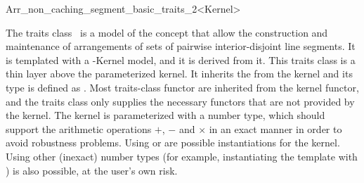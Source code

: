 
\ccRefPageBegin

\begin{ccRefClass}{Arr_non_caching_segment_basic_traits_2<Kernel>}
    
\ccDefinition 

The traits class \ccRefName\ is a model of the 
concept that allow the construction and maintenance of arrangements of
sets of pairwise interior-disjoint line segments. It is templated with a
\cgal-Kernel model, and it is derived from it. This traits class is a
thin layer above the parameterized kernel. It inherits the 
from the kernel and its  type is defined as
. Most traits-class functor are inherited from the
kernel functor, and the traits class only supplies the necessary functors
that are not provided by the kernel. The kernel is parameterized with a
number type, which should support the arithmetic operations $+$, $-$ and
$\times$ in an exact manner in order to avoid robustness problems.
Using  or  are possible
instantiations for the kernel. Using other (inexact) number types
(for example, instantiating the template with
) is also possible, at the user's own
risk.
    
 
\ccIsModel

\end{ccRefClass}
\ccRefPageEnd
